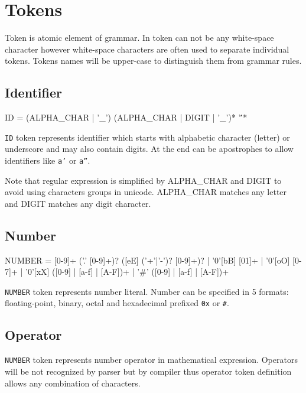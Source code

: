 \section{Tokens}

Token is atomic element of grammar.
In token can not be any white-space character however white-space characters are often used to separate individual tokens.
Tokens names will be upper-case to distinguish them from grammar rules.


\subsection{Identifier}
\begin{Grammar}
ID = (ALPHA_CHAR | '_') (ALPHA_CHAR | DIGIT | '_')* '\''*
\end{Grammar}

\texttt{ID} token represents identifier which starts with alphabetic character (letter) or underscore and may also contain digits.
At the end can be apostrophes to allow identifiers like \texttt{a'} or \texttt{a''}.

Note that regular expression is simplified by ALPHA\_CHAR and DIGIT to avoid using characters groups in unicode.
ALPHA\_CHAR matches any letter and DIGIT matches any digit character.


\subsection{Number}
\begin{Grammar}
NUMBER = [0-9]+ ('.' [0-9]+)? ([eE] ('+'|'-')? [0-9]+)?
	| '0'[bB] [01]+
	| '0'[oO] [0-7]+
	| '0'[xX] ([0-9] | [a-f] | [A-F])+
	| '#' ([0-9] | [a-f] | [A-F])+
\end{Grammar}

\texttt{NUMBER} token represents number literal.
Number can be specified in 5 formats: floating-point, binary, octal and hexadecimal prefixed \texttt{0x} or \texttt{\#}.


\subsection{Operator}

\texttt{NUMBER} token represents number operator in mathematical expression.
Operators will be not recognized by parser but by compiler thus operator token definition allows any combination of characters.



